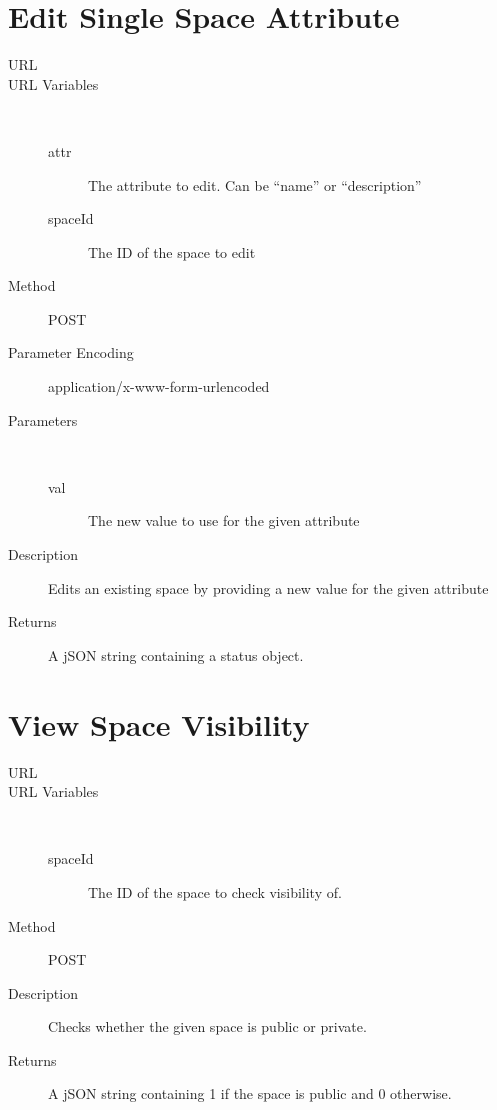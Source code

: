 \section{Edit Single Space Attribute}
\begin{description}
\item [URL] 
\item [URL Variables] \
	\begin{description}
	\item [attr]  The attribute to edit. Can be ``name'' or ``description''
	\item [spaceId] \type{Integer} The ID of the space to edit
	\end{description}
\item [Method] POST
\item [Parameter Encoding] application/x-www-form-urlencoded
\item [Parameters] \
	\begin{description}
	\item [val]  The new value to use for the given attribute
	\end{description}
\item [Description] Edits an existing space by providing a new value for the given attribute
\item [Returns] A jSON string containing a status object.
\end{description}

\section{View Space Visibility}
\begin{description}
\item [URL] 
\item [URL Variables] \
	\begin{description}
	\item [spaceId] \type{Integer} The ID of the space to check visibility of.
	\end{description}
\item [Method] POST
\item [Description] Checks whether the given space is public or private.
\item [Returns] A jSON string containing 1 if the space is public and 0 otherwise.
\end{description}

